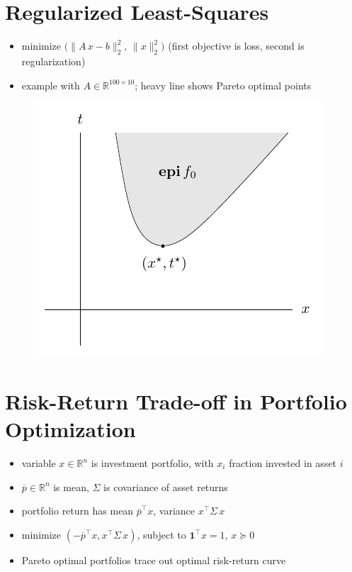 \documentclass[11pt]{extarticle}
\newcommand{\ds}{\displaystyle}
\theoremstyle{definition}
\begin{document}
\newpage

\section*{Regularized Least-Squares}
\begin{itemize}
  \item minimize $\ds\big(\|A\,x - b\|^2_2,\,\|x\|^2_2\big)$ (first objective is loss, second is regularization)
  \item example with $\ds A\in\mathbb{R}^{100\times10}$; heavy line shows Pareto optimal points
\end{itemize}
\vspace{-2em}
\begin{figure}[!htbp]
  \centering
  \includegraphics[scale=0.75,page=11]{fig/04.pdf}
\end{figure}

\newpage

\section*{Risk-Return Trade-off in Portfolio Optimization}

\begin{itemize}
  \item variable $x\in\mathbb{R}^n$ is investment portfolio, with $x_i$ fraction invested in asset $i$
  \item $\ds\overline{p}\in\mathbb{R}^n$ is mean, $\ds\Sigma$ is covariance of asset returns
  \item portfolio return has mean $\ds\overline{p}^\top x$, variance $x^\top\Sigma\,x$
  \item minimize $\ds(-\overline{p}^\top x, x^\top\Sigma\,x)$, subject to $\mathbf{1}^\top x = 1$, $x\succcurlyeq 0$
  \item Pareto optimal portfolios trace out optimal risk-return curve
\end{itemize}
\end{document}
